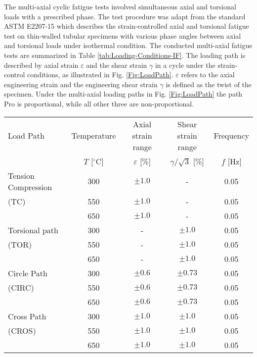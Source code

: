 \documentclass[preprint,5p,twocolumn,11pt,sort&compress]{elsarticle}
\begin{document}
The multi-axial cyclic fatigue tests involved simultaneous axial and torsional loads with a prescribed phase.
The test procedure was adapt from the standard ASTM E2207-15 which describes the strain-controlled axial and torsional fatigue test on thin-walled tubular specimens with various phase angles between axial and torsional loads under isothermal condition.
The conducted multi-axial fatigue tests are summarized in Table \ref{tab:Loading-Conditions-IF}. The loading path is described by axial strain $\varepsilon$ and the shear strain $\gamma$ in a cycle under the strain-control conditions, as illustrated in Fig. \ref{Fig:LoadPath}. $\varepsilon$ refers to the axial engineering strain and the engineering shear strain $\gamma$ is defined as the twist of the specimen. Under the multi-axial loading paths in Fig.  \ref{Fig:LoadPath} the path Pro is proportional, while all other three are non-proportional.

\begin{table*}[htbp]
  \centering
  \caption{Temperature and loading conditions of the isothermal test program.}
    \begin{tabular}{lcccc}
    \hline
    Load Path & Temperature & Axial strain range  & Shear strain range & Frequency\\
              & $T$ [$^{\circ}$C] & $\varepsilon$ [\%]& $\gamma /\sqrt 3$ [\%] & $f$ [Hz]  \\
    \hline
    Tension Compression   & 300 & $\pm1.0$ & - & 0.05 \\
    (TC)         & 550 & $\pm1.0$ & - & 0.05 \\
                 & 650 & $\pm1.0$ & - & 0.05 \\
    \hline
    Torsional path & 300 & - & $\pm1.0$ & 0.05 \\
    (TOR)       & 550 & - & $\pm1.0$ & 0.05 \\
                & 650 & - & $\pm1.0$ & 0.05 \\
    \hline
    Circle Path & 300 & $\pm0.6$ & $\pm0.73$ & 0.05 \\
    (CIRC)      & 550 & $\pm0.6$ & $\pm0.73$ & 0.05 \\
                & 650 & $\pm0.6$ & $\pm0.73$ & 0.05 \\
    \hline
    Cross Path   & 300 & $\pm1.0$ & $\pm1.0$ & 0.05 \\
    (CROS)       & 550 & $\pm1.0$ & $\pm1.0$ & 0.05 \\
                 & 650 & $\pm1.0$ & $\pm1.0$ & 0.05 \\
    \hline
    \end{tabular}%
  \label{tab:Loading-Conditions-IF}%
\end{table*}%
\end{document}
